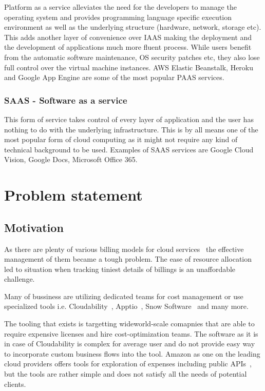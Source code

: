 \documentclass[licencjacka,en]{thesisclass}
\begin{document}
        Platform as a service alleviates the need for the developers to manage the operating system and
        provides programming language specific execution environment as well as the underlying structure
        (hardware, network, storage etc). This adds another layer of convenience over IAAS making the deployment
        and the development of applications much more fluent process. While users benefit from the automatic software maintenance,
        OS security patches etc, they also lose full control over the virtual machine instances. AWS Elastic Beanstalk, Heroku
        and Google App Engine are some of the most popular PAAS services.

        \subsection{SAAS - Software as a service}

        This form of service takes control of every layer of application and the user has nothing to do with
        the underlying infrastructure. This is by all means one of the most popular form of cloud computing as
        it might not require any kind of technical background to be used. Examples of SAAS services are Google
        Cloud Vision, Google Docs, Microsoft Office 365. 

\chapter{Problem statement}

    \section{Motivation}

        As there are plenty of various billing models for cloud services~\cite{GLaatikainen}
        the effective management of them became a tough problem.
        The ease of resource allocation led to situation when tracking tiniest details of billings is an unaffordable challenge.

        Many of bussiness are utilizing dedicated teams for cost management or use specialized tools i.e.
        Cloudability~\cite{Cloudability}, Apptio~\cite{Apptio}, Snow Software~\cite{SnowSoftware} and many more.

        The tooling that exists is targetting wideworld-scale comapnies that are able to require expensive licenses and hire cost-optimization teams.
        The software as it is in case of Cloudability is complex for average user and do not provide easy way to incorporate custom business flows into the tool.
        Amazon as one on the leading cloud providers offers tools for exploration of expenses including public APIs~\cite{AWSCostManagement},
        but the tools are rather simple and does not satisfy all the needs of potential clients.
\end{document}
